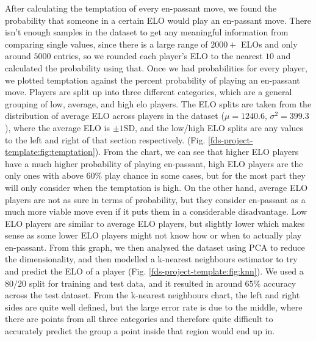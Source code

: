 \documentclass[10pt,a4paper,twocolumn]{article}
\begin{document}
After calculating the temptation of every en-passant move, we found the probability that someone in a certain ELO would play an en-passant move. There isn't enough samples in the dataset to get any meaningful information from comparing single values, since there is a large range of $2000+$ ELOs and only around $5000$ entries, so we rounded each player's ELO to the nearest $10$ and calculated the probability using that. Once we had probabilities for every player, we plotted temptation against the percent probability of playing an en-passant move. Players are split up into three different categories, which are a general grouping of low, average, and high elo players. The ELO splits are taken from the distribution of average ELO across players in the dataset ($\mu=1240.6,\,\sigma^{2}=399.3$), where the average ELO is $\pm 1\text{SD}$, and the low/high ELO splits are any values to the left and right of that section respectively. (Fig. \ref{fds-project-template:fig:temptation}).\newline
From the chart, we can see that higher ELO players have a much higher probability of playing en-passant, high ELO players are the only ones with above 60\% play chance in some cases,  but for the most part they will only consider when the temptation is high. On the other hand, average ELO players are not as sure in terms of probability, but they consider en-passant as a much more viable move even if it puts them in a considerable disadvantage. Low ELO players are similar to average ELO players, but slightly lower which makes sense as some lower ELO players might not know how or when to actually play en-passant. \newline
From this graph, we then analysed the dataset using PCA to reduce the dimensionality, and then modelled a k-nearest neighbours estimator to try and predict the ELO of a player (Fig. \ref{fds-project-template:fig:knn}). We used a $80/20$ split for training and test data, and it resulted in around $65\%$ accuracy across the test dataset. From the k-nearest neighbours chart, the left and right sides are quite well defined, but the large error rate is due to the middle, where there are points from all three categories and therefore quite difficult to accurately predict the group a point inside that region would end up in.
\end{document}
